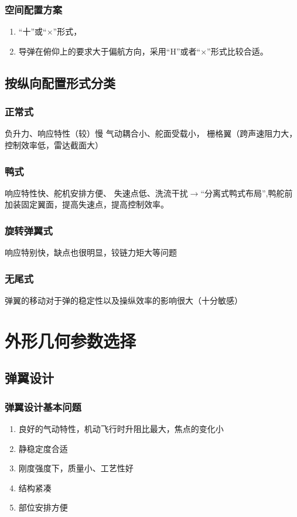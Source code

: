 \subsubsection*{空间配置方案}
\begin{enumerate}
    \item “十”或“$\times$”形式，
    \item 导弹在俯仰上的要求大于偏航方向，采用“H”或者“$\times$”形式比较合适。
\end{enumerate}
\subsection{按纵向配置形式分类}
\subsubsection*{正常式}
负升力、响应特性（较）慢
气动耦合小、舵面受载小，
栅格翼（跨声速阻力大，控制效率低，雷达截面大）
\subsubsection*{鸭式}
响应特性快、舵机安排方便、
失速点低、洗流干扰$\rightarrow$“分离式鸭式布局”,鸭舵前加装固定翼面，提高失速点，提高控制效率。
\subsubsection*{旋转弹翼式}
响应特别快，缺点也很明显，铰链力矩大等问题
\subsubsection*{无尾式}
弹翼的移动对于弹的稳定性以及操纵效率的影响很大（十分敏感）
\section{外形几何参数选择}
\subsection{弹翼设计}
\subsubsection{弹翼设计基本问题}
\begin{enumerate}
    \item 良好的气动特性，机动飞行时升阻比最大，焦点的变化小
    \item 静稳定度合适
    \item 刚度强度下，质量小、工艺性好
    \item 结构紧凑
    \item 部位安排方便
\end{enumerate}
